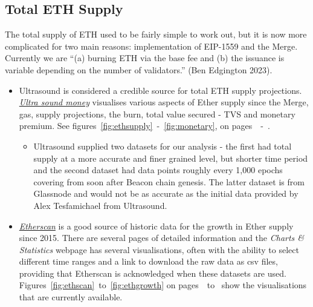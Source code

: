 \documentclass[UTF8]{article}
\begin{document}
 \subsection{Total ETH Supply}
\label{sec:ethsupply} 
        The total supply of ETH used to be fairly simple to work out, but it is now more complicated for two main reasons:  implementation of EIP-1559 and the Merge.
Currently we are ``(a) burning ETH via the base fee and (b) the issuance is variable depending on the number of validators.'' (Ben Edgington 2023). 
\begin{itemize}
	\item Ultrasound is considered a credible source for total ETH supply projections. \\\textit{\href{https://ultrasound.money/}{Ultra sound money}} visualises various aspects of Ether supply since the Merge, gas, supply projections, the burn, total value secured - TVS and monetary premium. See figures~\ref{fig:ethsupply}~-~\ref{fig:monetary}, on pages~\pageref{fig:ethsupply}~-~\pageref{fig:monetary}.  

\begin{itemize}
	\item Ultrasound supplied two datasets for our analysis - the first had total supply at a more accurate and finer grained level, but shorter time period and the second dataset had data points roughly every 1,000 epochs covering from soon after Beacon chain genesis. The latter dataset is from Glassnode and would not be as accurate as the initial data provided by Alex Tesfamichael from Ultrasound.
\end{itemize}
	\item \textit{\href{https://etherscan.io/chart/ethersupplygrowth}{Etherscan}} is a good source of historic data for the growth in Ether supply since 2015. There are several pages of detailed information and the \textit{Charts \& Statistics} webpage has several visualisations, often with the ability to select different time ranges and a link to download the raw data as csv files, providing that Etherscan is acknowledged when these datasets are used.\\
	Figures~\ref{fig:ethscan}~to~\ref{fig:ethgrowth} on pages~\pageref{fig:ethscan}~to~\pageref{fig:ethgrowth} show the visualisations that are currently available.
\end{itemize}
\end{document}
